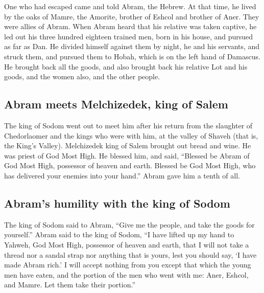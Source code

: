 \begin{paracol}{2}
\begin{otherlanguage}{english}
 One who had escaped came and told Abram, the Hebrew. At
that time, he lived by the oaks of Mamre, the Amorite, brother of Eshcol
and brother of Aner. They were allies of Abram.  When
Abram heard that his relative was taken captive, he led out his three
hundred eighteen trained men, born in his house, and pursued as far as
Dan.  He divided himself against them by night, he and
his servants, and struck them, and pursued them to Hobah, which is on
the left hand of Damascus.  He brought back all the
goods, and also brought back his relative Lot and his goods, and the
women also, and the other people.

\hypertarget{abram-meets-melchizedek-king-of-salem}{%
\subsection{Abram meets Melchizedek, king of
Salem}\label{abram-meets-melchizedek-king-of-salem}}

 The king of Sodom went out to meet him after his return
from the slaughter of Chedorlaomer and the kings who were with him, at
the valley of Shaveh (that is, the King's Valley). 
Melchizedek king of Salem brought out bread and wine. He was priest of
God Most High.  He blessed him, and said, ``Blessed be
Abram of God Most High, possessor of heaven and earth. 
Blessed be God Most High, who has delivered your enemies into your
hand.'' Abram gave him a tenth of all.

\hypertarget{abrams-humility-with-the-king-of-sodom}{%
\subsection{Abram's humility with the king of
Sodom}\label{abrams-humility-with-the-king-of-sodom}}

 The king of Sodom said to Abram, ``Give me the people,
and take the goods for yourself.''  Abram said to the
king of Sodom, ``I have lifted up my hand to Yahweh, God Most High,
possessor of heaven and earth,  that I will not take a
thread nor a sandal strap nor anything that is yours, lest you should
say, `I have made Abram rich.'  I will accept nothing
from you except that which the young men have eaten, and the portion of
the men who went with me: Aner, Eshcol, and Mamre. Let them take their
portion.''

\end{otherlanguage}


\end{paracol}
